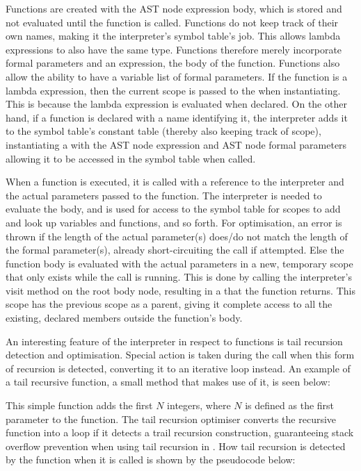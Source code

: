 Functions are created with the AST node expression body, which is
stored and not evaluated until the function is called. Functions
do not keep track of their own names, making it the interpreter's
symbol table's job. This allows lambda expressions to also have the
same type. Functions therefore merely incorporate formal parameters
and an expression, the body of the function. Functions also allow
the ability to have a variable list of formal parameters. If the
function is a lambda expression, then the current scope is passed to
the  when instantiating. This is because the lambda
expression is evaluated when declared. On the other hand, if a function
is declared with a name identifying it, the interpreter adds it to the
symbol table's constant table (thereby also keeping track of scope),
instantiating a  with the AST node expression and AST
node formal parameters allowing it to be accessed in the symbol table
when called.

When a function is executed, it is called with a reference to the interpreter
and the actual parameters passed to the function. The interpreter is needed to
evaluate the body, and is used for access to the symbol table for scopes to add
and look up variables and functions, and so forth. For optimisation, an error is
thrown if the length of the actual parameter(s) does/do not match the length of
the formal parameter(s), already short-circuiting the call if attempted. Else
the function body is evaluated with the actual parameters in a new, temporary
scope that only exists while the call is running. This is done by calling the
interpreter's visit method on the root body node, resulting in a
 that the function returns. This scope has the previous scope as
a parent, giving it complete access to all the existing, declared members
outside the function's body.

An interesting feature of the interpreter in respect to functions is tail
recursion detection and optimisation. Special action is taken during the call
when this form of recursion is detected, converting it to an iterative loop
instead. An example of a tail recursive function, a small method
 that makes use of it, is seen below:


This simple function adds the first $N$ integers, where $N$ is defined as the
first parameter to the function. The tail recursion optimiser converts the
recursive function into a loop if it detects a trail recursion construction,
guaranteeing stack overflow prevention when using tail recursion in
\productname. How tail recursion is detected by the function when it is called
is shown by the pseudocode below:

